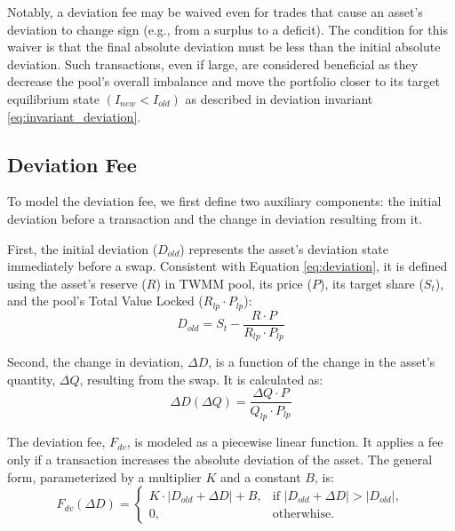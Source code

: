 Notably, a deviation fee may be waived even for trades that cause an asset's deviation to change sign (e.g., from a surplus to a deficit). The condition for this waiver is that the final absolute deviation must be less than the initial absolute deviation. Such transactions, even if large, are considered beneficial as they decrease the pool's overall imbalance and move the portfolio closer to its target equilibrium state $(I_{new} < I_{old})$ as described in deviation invariant \ref{eq:invariant_deviation}.

\subsection{Deviation Fee}
To model the deviation fee, we first define two auxiliary components: the initial deviation before a transaction and the change in deviation resulting from it.

First, the initial deviation ($D_{old}$) represents the asset's deviation state immediately before a swap. Consistent with Equation \ref{eq:deviation}, it is defined using the asset's reserve ($R$) in TWMM pool, its price ($P$), its target share ($S_t$), and the pool's Total Value Locked ($R_{lp} \cdot P_{lp}$):
\begin{equation}
	\label{eq:deviation_old_function_formula}
	D_{old} = S_t - \frac{R \cdot P}{R_{lp} \cdot P_{lp}}
\end{equation}	

Second, the change in deviation, $\Delta D$, is a function of the change in the asset's quantity, $\Delta Q$, resulting from the swap. It is calculated as:
\begin{equation}
	\label{eq:deviation_delta_function_formula}
	\Delta D(\Delta Q) = \frac{ \Delta Q \cdot P}{Q_{lp} \cdot P_{lp}}
\end{equation}	

The deviation fee, $F_{dv}$, is modeled as a piecewise linear function. It applies a fee only if a transaction increases the absolute deviation of the asset. The general form, parameterized by a multiplier $K$ and a constant $B$, is:
\begin{equation}
	\label{eq:basic_deviation_function}
	F_{dv}(\Delta D) = \begin{cases} 
		K \cdot \lvert D_{old} + \Delta D \rvert + B, & \text{if } \lvert D_{old} + \Delta D \rvert > \lvert D_{old} \rvert, \\
		0, & \text{otherwhise.}
	\end{cases}	
\end{equation}

